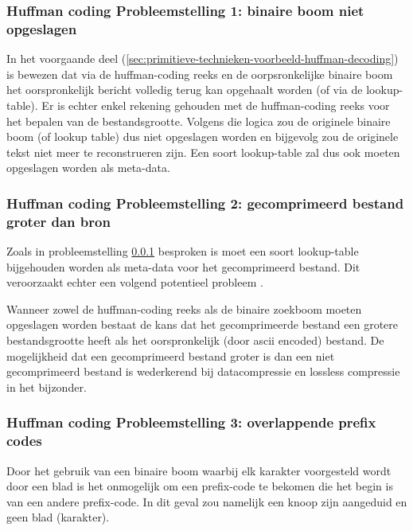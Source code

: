 \subsubsection{Huffman coding Probleemstelling 1: binaire boom niet opgeslagen}
\label{sec:primitieve-technieken-voorbeeld-huffman-probleem-1}
In het voorgaande deel (\ref{sec:primitieve-technieken-voorbeeld-huffman-decoding}) is bewezen dat via de \gls{huffman-coding} reeks en de oorpsronkelijke binaire boom het oorspronkelijk bericht volledig terug kan opgehaalt worden (of via de \gls{lookup-table}). Er is echter enkel rekening gehouden met de \gls{huffman-coding} reeks voor het bepalen van de bestandsgrootte. Volgens die logica zou de originele binaire boom (of lookup table) dus niet opgeslagen worden en bijgevolg zou de originele tekst niet meer te reconstrueren zijn. Een soort \gls{lookup-table} zal dus ook moeten opgeslagen worden als \gls{meta-data}.


\subsubsection{Huffman coding Probleemstelling 2: gecomprimeerd bestand groter dan bron}
Zoals in probleemstelling \ref{sec:primitieve-technieken-voorbeeld-huffman-probleem-1} besproken is moet een soort \gls{lookup-table} bijgehouden worden als \gls{meta-data} voor het gecomprimeerd bestand. Dit veroorzaakt echter een volgend potentieel probleem .


Wanneer zowel de \gls{huffman-coding} reeks als de binaire zoekboom moeten opgeslagen worden bestaat de kans dat het gecomprimeerde bestand een grotere bestandsgrootte heeft als het oorspronkelijk (door \gls{ascii} encoded) bestand. De mogelijkheid dat een gecomprimeerd bestand groter is dan een niet gecomprimeerd bestand is wederkerend bij \gls{datacompressie} en \gls{lossless} compressie in het bijzonder.


\subsubsection{Huffman coding Probleemstelling 3: overlappende prefix codes}
\label{sec:primitieve-technieken-voorbeeld-huffman-probleem-3}
\label{sec:primitieve-technieken-voorbeeld-huffman-probleem-2}
Door het gebruik van een binaire boom waarbij elk karakter voorgesteld wordt door een blad is het onmogelijk om een \gls{prefix-code} te bekomen die het begin is van een andere \gls{prefix-code}. In dit geval zou namelijk een knoop zijn aangeduid en geen blad (karakter).

